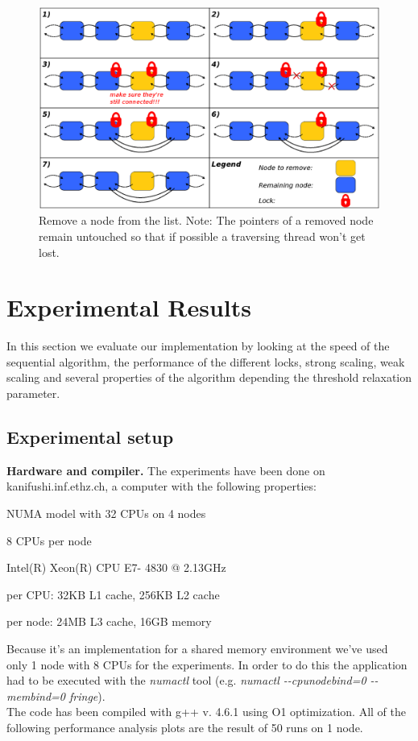 \documentclass[letterpaper]{article}
\newcommand{\mypar}[1]{{\bf #1.}}
\begin{document}
\begin{figure}[h]\centering
  \includegraphics[scale=0.31]{remove.eps}
  \caption{Remove a node from the list. Note: The pointers of a removed node remain untouched so that if possible a traversing thread won't get lost. \label{fig:remove}}
\end{figure}



\section{Experimental Results}\label{sec:exp}

In this section we evaluate our implementation by looking at the speed of the sequential algorithm, the performance of the different locks, strong scaling, weak scaling and several properties of the algorithm depending the threshold relaxation parameter.

\subsection{Experimental setup}\label{ssec:setup}

\mypar{Hardware and compiler}
The experiments have been done on kanifushi.inf.ethz.ch, a computer with the following properties:
\begin{compactitem}
\item NUMA model with 32 CPUs on 4 nodes
\item 8 CPUs per node
\item Intel(R) Xeon(R) CPU E7- 4830 @ 2.13GHz
\item per CPU: 32KB L1 cache, 256KB L2 cache
\item per node: 24MB L3 cache, 16GB memory
\end{compactitem}
Because it's an implementation for a shared memory environment we've used only 1 node with 8 CPUs for the experiments. In order to do this the application had to be executed with the \textit{numactl} tool (e.g. \textit{numactl -{}-cpunodebind=0 -{}-membind=0 fringe}).\\
The code has been compiled with g++ v. 4.6.1 using O1 optimization. All of the following performance analysis plots are the result of 50 runs on 1 node.
\end{document}

